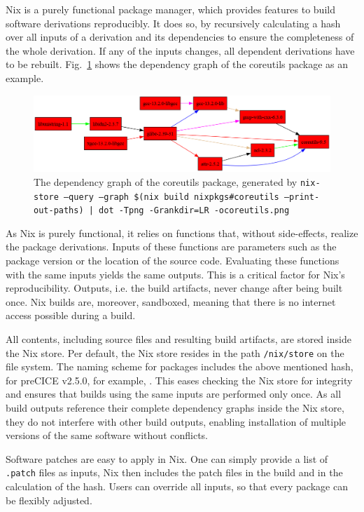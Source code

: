 \documentclass{eceasst}
\begin{document}
Nix is a purely functional package manager, which provides features to build software derivations reproducibly.
It does so, by recursively calculating a hash over all inputs of a derivation and its dependencies to ensure the completeness of the whole derivation.
If any of the inputs changes, all dependent derivations have to be rebuilt.
Fig.~\ref{fig:nix-graph} shows the dependency graph of the coreutils package as an example.

\begin{figure}
    \centering
    \includegraphics[width=1\textwidth]{figures/coreutils.png}
    \caption{The dependency graph of the coreutils package, generated by \texttt{nix-store --query --graph \$(nix build nixpkgs\#coreutils --print-out-paths) | dot -Tpng -Grankdir=LR -ocoreutils.png}}
    \label{fig:nix-graph}
\end{figure}

As Nix is purely functional, it relies on functions that, without side-effects, realize the package derivations.
Inputs of these functions are parameters such as the package version or the location of the source code.
Evaluating these functions with the same inputs yields the same outputs.
This is a critical factor for Nix's reproducibility.
Outputs, i.e. the build artifacts, never change after being built once.
Nix builds are, moreover, sandboxed, meaning that there is no internet access possible during a build.

All contents, including source files and resulting build artifacts, are stored inside the Nix store.
Per default, the Nix store resides in the path \texttt{/nix/store} on the file system.
The naming scheme for packages includes the above mentioned hash, for preCICE v2.5.0, for example,
.
This eases checking the Nix store for integrity and ensures that builds using the same inputs are performed only once.
As all build outputs reference their complete dependency graphs inside the Nix store, they do not interfere with other build outputs, enabling installation of multiple versions of the same software without conflicts.

Software patches are easy to apply in Nix.
One can simply provide a list of \texttt{.patch} files as inputs, Nix then includes the patch files in the build and in the calculation of the hash.
Users can override all inputs, so that every package can be flexibly adjusted.
\end{document}
